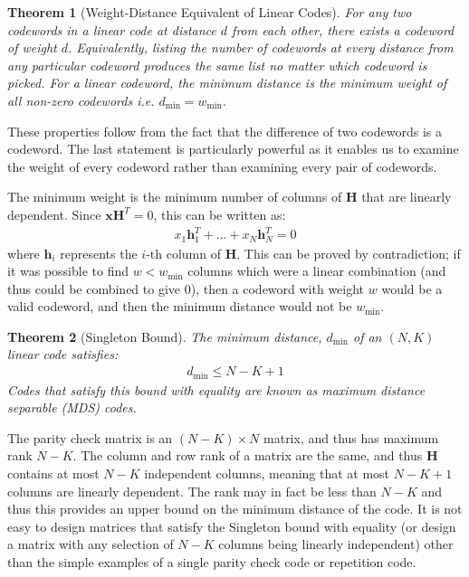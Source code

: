 \documentclass[]{book}
\newtheorem{theorem}{Theorem}[section]
\newcommand{\vect}[1]{\boldsymbol{\mathbf{#1}}}
\newcommand{\qx}[1]{%
	\leavevmode %
	\marginpar{\color{blue}\small\emph{#1}}%
}
\begin{document}
\begin{theorem}[Weight-Distance Equivalent of Linear Codes]
	For any two codewords in a linear code at distance $d$ from each other, there exists a codeword of weight $d$. Equivalently, listing the number of codewords at every distance from any particular codeword produces the same list no matter which codeword is picked. For a linear codeword, the minimum distance is the minimum weight of all non-zero codewords i.e. $d_\text{min} = w_\text{min}$. 
\end{theorem}
These properties follow from the fact that the difference of two codewords is a codeword. The last statement is particularly powerful as it enables us to examine the weight of every codeword rather than examining every pair of codewords. 

\qx{Proof: Weights and the Parity Check Matrix}The minimum weight is the minimum number of columns of $\vect{H}$ that are linearly dependent. Since $\vect{xH}^T = 0$, this can be written as:
\begin{align}
x_1 \vect{h}_1^T + \ldots + x_N \vect{h}_N^T = 0
\end{align}
where $\vect{h}_i$ represents the $i$-th column of $\vect{H}$. This can be proved by contradiction; if it was possible to find $w < w_\text{min}$ columns which were a linear combination (and thus could be combined to give $0$), then a codeword with weight $w$ would be a valid codeword, and then the minimum distance would not be $w_\text{min}$. 

\begin{theorem}[Singleton Bound]
	The minimum distance, $d_\text{min}$ of an $(N, K)$ linear code satisfies:
	\begin{align}
	d_\text{min} \leq N - K + 1
	\end{align}
	Codes that satisfy this bound with equality are known as maximum distance separable (MDS) codes.
\end{theorem}
\qx{Why?}The parity check matrix is an $(N - K) \times N$ matrix, and thus has maximum rank $N-K$. The column and row rank of a matrix are the same, and thus $\vect{H}$ contains at most $N - K$ independent columns, meaning that at most $N - K + 1$ columns are linearly dependent. The rank may in fact be less than $N-K$ and thus this provides an upper bound on the minimum distance of the code. It is not easy to design matrices that satisfy the Singleton bound with equality (or design a matrix with any selection of $N-K$ columns being linearly independent) other than the simple examples of a single parity check code or repetition code. 
\end{document}
